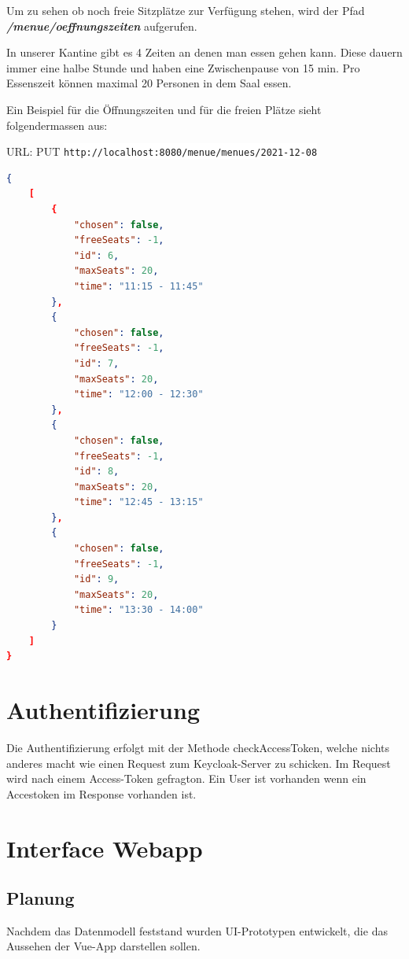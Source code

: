 Um zu sehen ob noch freie Sitzplätze zur Verfügung stehen, wird der Pfad \textbf{\textit{/menue/oeffnungszeiten}} aufgerufen. 

In unserer Kantine gibt es 4 Zeiten an denen man essen gehen kann. Diese dauern immer eine halbe Stunde und haben eine Zwischenpause von 15 min. 
Pro Essenszeit können maximal 20 Personen in dem Saal essen.

Ein Beispiel für die Öffnungszeiten und für die freien Plätze sieht folgendermassen aus:

URL: PUT \colorbox{white}{\lstinline[basicstyle=\ttfamily\color{black},language=html]|http://localhost:8080/menue/menues/2021-12-08|}


\begin{lstlisting}[language=json,firstnumber=1]
{
    [
        {
            "chosen": false,
            "freeSeats": -1,
            "id": 6,
            "maxSeats": 20,
            "time": "11:15 - 11:45"
        },
        {
            "chosen": false,
            "freeSeats": -1,
            "id": 7,
            "maxSeats": 20,
            "time": "12:00 - 12:30"
        },
        {
            "chosen": false,
            "freeSeats": -1,
            "id": 8,
            "maxSeats": 20,
            "time": "12:45 - 13:15"
        },
        {
            "chosen": false,
            "freeSeats": -1,
            "id": 9,
            "maxSeats": 20,
            "time": "13:30 - 14:00"
        }
    ]
}
\end{lstlisting}

\section{Authentifizierung}
\author{Bozidar Spasenovic}
Die Authentifizierung erfolgt mit der Methode checkAccessToken, welche nichts anderes macht wie einen Request zum Keycloak-Server zu schicken.
Im Request wird nach einem Access-Token gefragton.
Ein User  ist vorhanden wenn ein Accestoken im Response vorhanden ist.



\section {Interface Webapp}
\author{Benjamin Besic}
\subsection{Planung}

Nachdem das Datenmodell feststand wurden UI-Prototypen entwickelt, die das Aussehen der Vue-App darstellen sollen.

